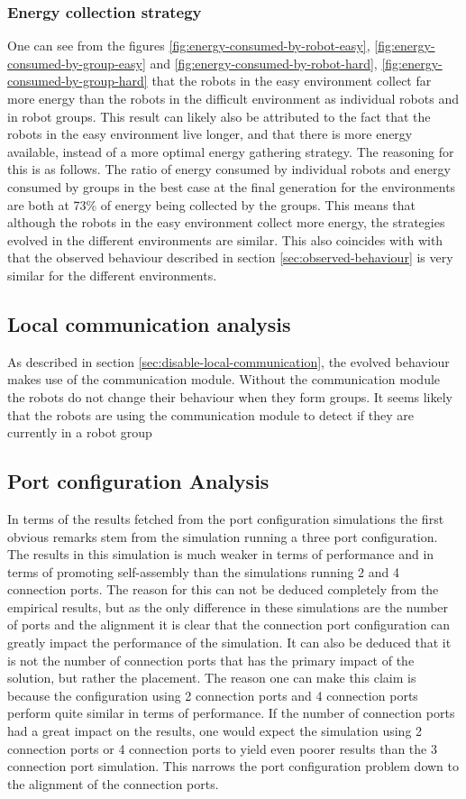 \subsubsection{Energy collection strategy}
One can see from the figures \ref{fig:energy-consumed-by-robot-easy}, \ref{fig:energy-consumed-by-group-easy} and \ref{fig:energy-consumed-by-robot-hard}, \ref{fig:energy-consumed-by-group-hard} that the robots in the easy environment collect far more energy than the robots in the difficult environment as individual robots and in robot groups.
This result can likely also be attributed to the fact that the robots in the easy environment live longer, and that there is more energy available, instead of a more optimal energy gathering strategy.
The reasoning for this is as follows.
The ratio of energy consumed by individual robots and energy consumed by groups in the best case at the final generation for the environments are both at 73\% of energy being collected by the groups.
This means that although the robots in the easy environment collect more energy, the strategies evolved in the different environments are similar.
This also coincides with with that the observed behaviour described in section \ref{sec:observed-behaviour} is very similar for the different environments.

\subsection{Local communication analysis}
As described in section \ref{sec:disable-local-communication}, the evolved behaviour makes use of the communication module.
Without the communication module the robots do not change their behaviour when they form groups.
It seems likely that the robots are using the communication module to detect if they are currently in a robot group


\subsection{Port configuration Analysis}
In terms of the results fetched from the port configuration simulations the first obvious remarks stem from the simulation running a three port configuration.
The results in this simulation is much weaker in terms of performance and in terms of promoting self-assembly than the simulations running 2 and 4 connection ports.
The reason for this can not be deduced completely from the empirical results, but as the only difference in these simulations are the number of ports and the alignment it is clear that the connection port configuration can greatly impact the performance of the simulation.
It can also be deduced that it is not the number of connection ports that has the primary impact of the solution, but rather the placement.
The reason one can make this claim is because the configuration using 2 connection ports and 4 connection ports perform quite similar in terms of performance.
If the number of connection ports had a great impact on the results, one would expect the simulation using 2 connection ports or 4 connection ports to yield even poorer results than the 3 connection port simulation.
This narrows the port configuration problem down to the alignment of the connection ports.

